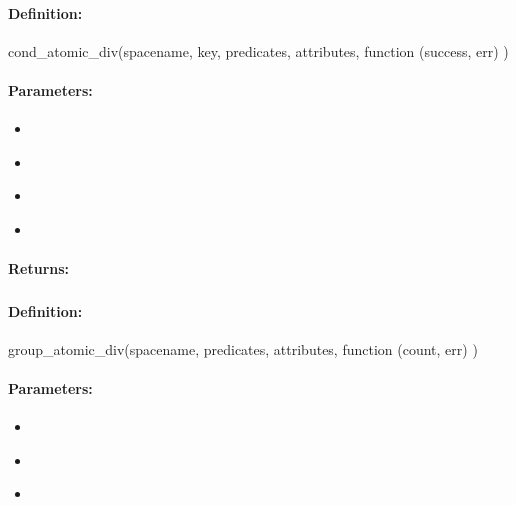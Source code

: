 \paragraph{Definition:}
\begin{javascriptcode}
cond_atomic_div(spacename, key, predicates, attributes, function (success, err) {})
\end{javascriptcode}
\paragraph{Parameters:}
\begin{itemize}[noitemsep]
\item {}\\

\item {}\\

\item {}\\

\item {}\\

\end{itemize}

\paragraph{Returns:}


\pagebreak
\subsubsection{}
\label{api:nodejs:group_atomic_div}


\paragraph{Definition:}
\begin{javascriptcode}
group_atomic_div(spacename, predicates, attributes, function (count, err) {})
\end{javascriptcode}
\paragraph{Parameters:}
\begin{itemize}[noitemsep]
\item {}\\

\item {}\\

\item {}\\

\end{itemize}

